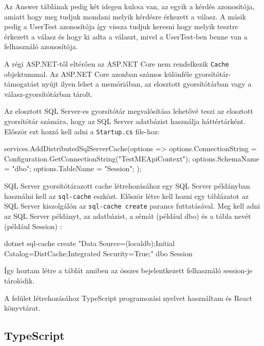 Az Answer táblának pedig két idegen kulcsa van, az egyik a kérdés azonosítója, amiatt hogy meg tudjuk mondani melyik kérdésre érkezett a válasz. A másik pedig a UserTest azonosítója így vissza tudjuk keresni hogy melyik tesztre érkezett a válasz és hogy ki adta a választ, mivel a UserTest-ben benne van a felhasználó azonosítója.


A régi ASP.NET-től eltérően az ASP.NET Core nem rendelkezik \lstinline{Cache} objektummal. Az ASP.NET Core azonban számos különféle gyorsítótár-támogatást nyújt ilyen lehet a memóriában, az elosztott gyorsítótárban vagy a válasz-gyorsítótárban tárolt. \newline

Az elosztott SQL Server-es gyorsítótár megvalósítása lehetővé teszi az elosztott gyorsítótár számára, hogy az SQL Server adatbázist használja háttértárként. Először ezt hozzá kell adni a \lstinline{Startup.cs} file-hoz:

\begin{cpp}
    services.AddDistributedSqlServerCache(options => {
        options.ConnectionString =
            Configuration.GetConnectionString("TestMEApiContext");
        options.SchemaName = "dbo";
        options.TableName = "Session";
    });
\end{cpp}

SQL Server gyorsítótárazott cache létrehozásához egy SQL Server példányban használni kell az \lstinline{sql-cache} eszközt. Először létre kell hozni egy táblázatot az SQL Server kiszolgálón az \lstinline{sql-cache create} parancs futtatásával. Meg kell adni az SQL Server példányt, az adatbázist, a sémát (például dbo) és a tábla nevét (például Session) \cite{distributedSQLServerCache}:

\begin{cpp}
    dotnet sql-cache create "Data Source=(localdb)\MSSQLLocalDB;Initial
    Catalog=DistCache;Integrated Security=True;" dbo Session
\end{cpp}

Így hoztam létre a táblát amiben az összes bejelentkezett felhasználó session-je tárolódik.


A felület létrehozásához TypeScript \cite{typescript} programozási nyelvet használtam és React \cite{react} könyvtárat.

\subsection{TypeScript}

